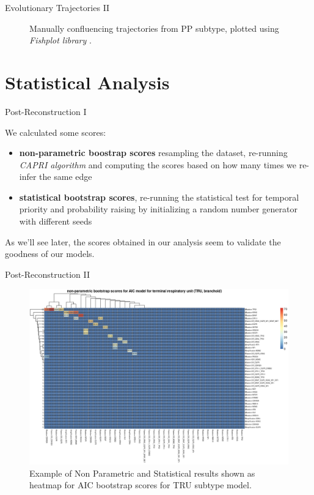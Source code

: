 \documentclass{beamer}
\begin{document}
\begin{frame}{Evolutionary Trajectories II}
{\begin{figure}
            \caption{Manually confluencing trajectories from PP subtype, plotted using \textit{Fishplot library} \cite{fishplot}.}
        \end{figure}
    }
\end{frame}
\section{Statistical Analysis}
\begin{frame}{Post-Reconstruction I}
  \begin{block}{}
    We calculated some scores:
    \begin{itemize}
      \item \textbf{non-parametric boostrap scores} resampling the dataset, re-running \textit{CAPRI algorithm} and computing the scores based on how many times we re-infer the same edge
      \item \textbf{statistical bootstrap scores}, re-running the statistical test for temporal priority and probability raising by initializing a random number generator with different seeds 
    \end{itemize}
  \end{block}
  \pause
  \begin{block}{}
    As we'll see later, the scores obtained in our analysis seem to validate the goodness of our models.
  \end{block}
\end{frame}
\begin{frame}{Post-Reconstruction II}
  \begin{figure}
    \centering
    \includegraphics[scale = 0.27]{img/TRU_heat.png}
    \caption{Example of Non Parametric and Statistical results shown as heatmap for AIC bootstrap scores for TRU subtype model.}
  \end{figure}
\end{frame}
\end{document}
